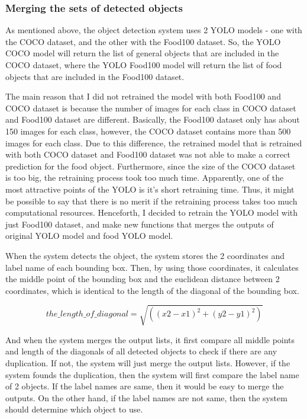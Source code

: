 \documentclass{article}
\begin{document}
\subsubsection{Merging the sets of detected objects}

As mentioned above, the object detection system uses 2 YOLO models - one with the COCO dataset, and the other with the Food100 dataset. So, the YOLO COCO model will return the list of general objects that are included in the COCO dataset, where the YOLO Food100 model will return the list of food objects that are included in the Food100 dataset.

The main reason that I did not retrained the model with both Food100 and COCO dataset is because the number of images for each class in COCO dataset and Food100 dataset are different. Basically, the Food100 dataset only has about 150 images for each class, however, the COCO dataset contains more than 500 images for each class. Due to this difference, the retrained model that is retrained with both COCO dataset and Food100 dataset was not able to make a correct prediction for the food object. Furthermore, since the size of the COCO dataset is too big, the retraining process took too much time. Apparently, one of the most attractive points of the YOLO is it's short retraining time. Thus, it might be possible to say that there is no merit if the retraining process takes too much computational resources. Henceforth, I decided to retrain the YOLO model with just Food100 dataset, and make new functions that merges the outputs of original YOLO model and food YOLO model.

When the system detects the object, the system stores the 2 coordinates and label name of each bounding box. Then, by using those coordinates, it calculates the middle point of the bounding box and the euclidean distance between 2 coordinates, which is identical to the length of the diagonal of the bounding box. 

\[the\_length\_of\_diagonal = \sqrt{((x2 - x1)^{2} + (y2 - y1)^{2})}\]

And when the system merges the output lists, it first compare all middle points and length of the diagonals of all detected objects to check if there are any duplication. If not, the system will just merge the output lists. However, if the system founds the duplication, then the system will first compare the label name of 2 objects. If the label names are same, then it would be easy to merge the outputs. On the other hand, if the label names are not same, then the system should determine which object to use.
\end{document}
